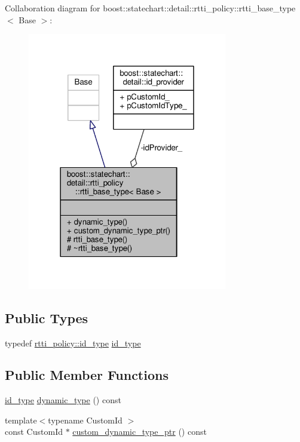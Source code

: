 Collaboration diagram for boost\+:\+:statechart\+:\+:detail\+:\+:rtti\+\_\+policy\+:\+:rtti\+\_\+base\+\_\+type$<$ Base $>$\+:
\nopagebreak
\begin{figure}[H]
\begin{center}
\leavevmode
\includegraphics[width=247pt]{classboost_1_1statechart_1_1detail_1_1rtti__policy_1_1rtti__base__type__coll__graph}
\end{center}
\end{figure}
\subsection*{Public Types}
\begin{DoxyCompactItemize}
\item 
typedef \mbox{\hyperlink{structboost_1_1statechart_1_1detail_1_1rtti__policy_a57d56a3531686fb2b92d733b5da620c2}{rtti\+\_\+policy\+::id\+\_\+type}} \mbox{\hyperlink{classboost_1_1statechart_1_1detail_1_1rtti__policy_1_1rtti__base__type_ad253f130608c3cec1fffdca105f17c1a}{id\+\_\+type}}
\end{DoxyCompactItemize}
\subsection*{Public Member Functions}
\begin{DoxyCompactItemize}
\item 
\mbox{\hyperlink{classboost_1_1statechart_1_1detail_1_1rtti__policy_1_1rtti__base__type_ad253f130608c3cec1fffdca105f17c1a}{id\+\_\+type}} \mbox{\hyperlink{classboost_1_1statechart_1_1detail_1_1rtti__policy_1_1rtti__base__type_abeadee5515390bd7de9529b6f08edaa8}{dynamic\+\_\+type}} () const
\item 
{\footnotesize template$<$typename Custom\+Id $>$ }\\const Custom\+Id $\ast$ \mbox{\hyperlink{classboost_1_1statechart_1_1detail_1_1rtti__policy_1_1rtti__base__type_aba3e05475b829d99bff210472232121f}{custom\+\_\+dynamic\+\_\+type\+\_\+ptr}} () const
\end{DoxyCompactItemize}

